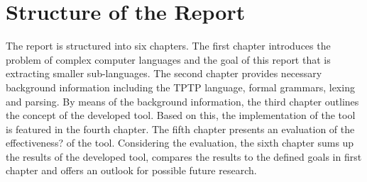 \section{Structure of the Report}\label{sec:IntroductionStructure}
The report is structured into six chapters. The first chapter introduces the problem of complex computer languages and the goal of this report that is extracting smaller sub-languages.
The second chapter provides necessary background information including the \ac{TPTP} language, formal grammars, lexing and parsing. By means of the background information, the third chapter outlines the concept of the developed tool.
Based on this, the implementation of the tool is featured in the fourth chapter.
The fifth chapter presents an evaluation of the effectiveness? of the tool. Considering the evaluation, the sixth chapter sums up the results of the developed tool, compares the results to the defined goals in first chapter and offers an outlook for possible future research.